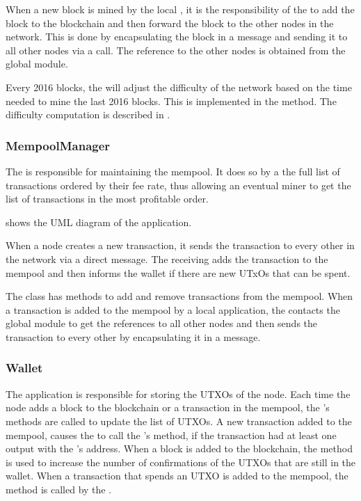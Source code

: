 When a new block is mined by the local , it is the responsibility
of the  to add the block to the blockchain and then
forward the block to the other nodes in the network. This is done by
encapsulating the block in a  message and sending it to
all other nodes via a  call. The reference to the other nodes
is obtained from the  global module.

Every 2016 blocks, the  will adjust the difficulty of
the network based on the time needed to mine the last 2016 blocks. This is
implemented in the  method. The difficulty computation
is described in .

\subsubsection{MempoolManager}\label{subsubsec:mempoolmanager}

The  is responsible for maintaining the mempool. It does
so by a the full list of transactions ordered by their fee rate, thus allowing
an eventual miner to get the list of transactions in the most profitable order.

 shows the UML diagram of the application.

When a node creates a new transaction, it sends the transaction to every other
 in the network via a direct message. The receiving
 adds the transaction to the mempool and then informs the
wallet if there are new UTxOs that can be spent.

The  class has methods to add and remove transactions from
the mempool. When a transaction is added to the mempool by a local application,
the  contacts the  global module to get
the references to all other nodes and then sends the transaction to every other
 by encapsulating it in a  message.

\subsubsection{Wallet}\label{subsubsec:wallet}

The  application is responsible for storing the UTXOs of the node.
Each time the node adds a block to the blockchain or a transaction in the
mempool, the 's methods are called to update the list of UTXOs. A
new transaction added to the mempool, causes the  to call
the 's  method, if the transaction had at least one
output with the 's address. When a block is added to the
blockchain, the  method is used to increase the number of
confirmations of the UTXOs that are still in the wallet. When a transaction
that spends an UTXO is added to the mempool, the  method is
called by the .

